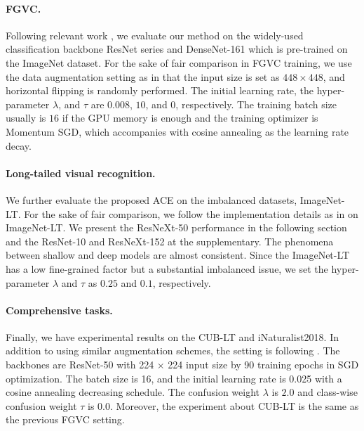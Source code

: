 \documentclass{article}
\begin{document}
\paragraph{FGVC.} Following relevant work \cite{yang2018learning,chen2019destruction,zheng2019looking}, we evaluate our method on the widely-used classification backbone ResNet series \cite{he2016deep} and DenseNet-161 \cite{huang2017densely} which is pre-trained on the ImageNet dataset. For the sake of fair comparison in FGVC training, we use the data augmentation setting as in \citet{chen2019destruction} that the input size is set as  $448 \times 448$, and horizontal flipping is randomly performed. The initial learning rate, the hyper-parameter $\lambda$, and $\tau$ are $0.008$, $10$, and $0$, respectively. The training batch size usually is $16$ if the GPU memory is enough and the training optimizer is Momentum SGD, which accompanies with cosine annealing \cite{loshchilov2016sgdr} as the learning rate decay.
\vspace{-10pt}
\paragraph{Long-tailed visual recognition.} We further evaluate the proposed ACE on the imbalanced datasets, ImageNet-LT. For the sake of fair comparison, we follow the implementation details as in \cite{Kang2020Decoupling} on ImageNet-LT. We present the ResNeXt-50 performance in the following section and the ResNet-10 and ResNeXt-152 at the supplementary. The phenomena between shallow and deep models are almost consistent. Since the ImageNet-LT has a low fine-grained factor but a substantial imbalanced issue, we set the hyper-parameter $\lambda$ and $\tau$ as $0.25$ and $0.1$, respectively.
\vspace{-10pt}
\paragraph{Comprehensive tasks.} Finally, we have experimental results on the CUB-LT and iNaturalist2018. In addition to using similar augmentation schemes, the setting is following \cite{Kang2020Decoupling,cao2019learning}. The backbones are ResNet-50 with 224 $\times$ 224 input size by 90 training epochs in SGD optimization. The batch size is 16, and the initial learning rate is 0.025 with a cosine annealing decreasing schedule. The confusion weight $\lambda$ is $2.0$ and class-wise confusion weight $\tau$ is $0.0$. Moreover, the experiment about CUB-LT is the same as the previous FGVC setting. 
\vspace{-10pt}
\end{document}
